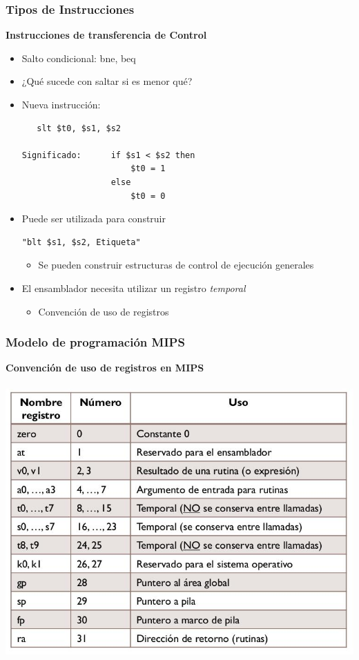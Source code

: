 \documentclass[aspectratio=169,compress]{beamer}
\begin{document}
\begin{footnotesize}
\begin{frame}[fragile]
\frametitle{Tipos de Instrucciones}
\begin{center}\textbf{Instrucciones de transferencia de Control}\end{center}

\begin{itemize}
\item Salto condicional: bne, beq
\item ¿Qué sucede con saltar si es menor qué?
\item Nueva instrucción:
\begin{verbatim}
   slt $t0, $s1, $s2

Significado:      if $s1 < $s2 then
                      $t0 = 1
                  else
                      $t0 = 0
\end{verbatim}
\item Puede ser utilizada para construir \begin{verbatim}"blt $s1, $s2, Etiqueta"\end{verbatim}
\begin{itemize}
\item Se pueden construir estructuras de control de ejecución generales
\end{itemize}
\item El ensamblador necesita utilizar un registro \textit{temporal}
\begin{itemize}
\item Convención de uso de registros
\end{itemize}
\end{itemize}
\end{frame}


\begin{frame}
\frametitle{Modelo de programación MIPS}
        \begin{center}
        \textbf{Convención de uso de registros en MIPS}
 \\~\\

\includegraphics[scale=0.3]{images/convencion.jpg}


\end{center}
\end{frame}
\end{footnotesize}
\end{document}
